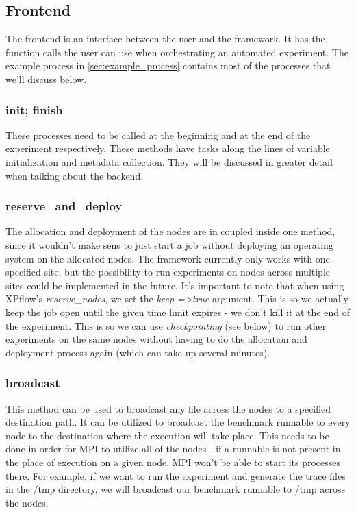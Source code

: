 \subsection{Frontend}
The frontend is an interface between the user and the framework. It
has the function calls the user can use when orchestrating an
automated experiment. The example process in \ref{sec:example_process}
contains most of the processes that we'll discuss below.
\subsubsection{init; finish}
These processes need to be called at the
beginning and at the end of the experiment respectively. These methods
have tasks along the lines of variable initialization and metadata
collection. They will be discussed in greater detail when talking
about the backend.
\label{sec:keeping_of_nodes}
\subsubsection{reserve\_and\_deploy}
The allocation and deployment of
the nodes are in coupled inside one method, since it wouldn't make
sens to just start a job without deploying an operating system on the
allocated nodes. The framework currently only works with one specified
site, but the possibility to run experiments on nodes across multiple
sites could be implemented in the future. It's important to note that
when using XPflow's \emph{reserve\_nodes}, we set the \emph{keep
  =\textgreater  true} argument. This is so we actually keep the job
open until the
given time limit expires - we don't kill it at the end of the
experiment. This is so we can use \emph{checkpointing} (see below) to
run other experiments on the same nodes without having to do the
allocation and deployment process again (which can take up several
minutes).
\subsubsection{broadcast}
This method can be used to broadcast any file
across the nodes to a specified destination path. It can be utilized
to broadcast the benchmark runnable to every node to the destination
where the execution will take place. This needs to be done in order
for MPI to utilize all of the nodes - if a runnable is not present in
the place of execution on a given node, MPI won't be able to start its
processes there. For example, if we want to run the experiment and
generate the trace files in the /tmp directory, we will broadcast our
benchmark runnable to /tmp across the nodes.
